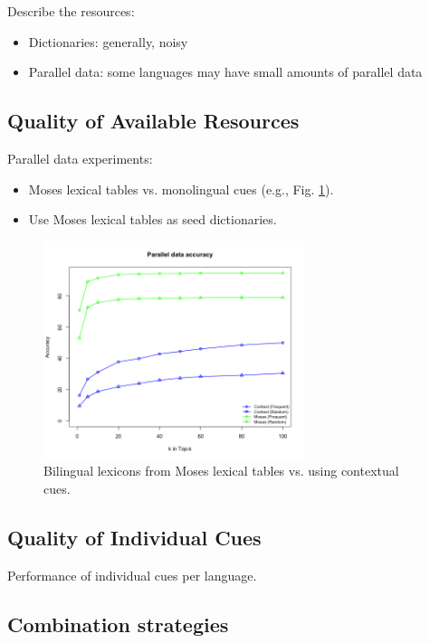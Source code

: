 \documentclass[11pt]{article}
\begin{document}
\noindent Describe the resources:
\begin{itemize}
  \item Dictionaries: generally, noisy
  \item Parallel data: some languages may have small amounts of parallel data
\end{itemize}

\subsection{Quality of Available Resources}

Parallel data experiments:
\begin{itemize}
  \item Moses lexical tables vs. monolingual cues (e.g., Fig. \ref{fig:parvsmono}).
  \item Use Moses lexical tables as seed dictionaries.
\end{itemize}

\begin{figure}
\begin{center}
\includegraphics[width=3in]{figures/mostfreqrand.png}
\caption{Bilingual lexicons from Moses lexical tables vs. using contextual cues.} \label{fig:parvsmono}
\end{center}
\end{figure}

\subsection{Quality of Individual Cues} 

Performance of individual cues per language.

\subsection{Combination strategies}
\end{document}
